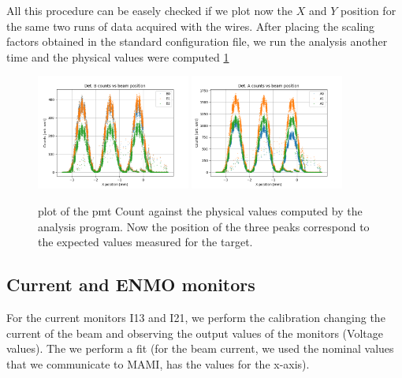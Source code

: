 All this procedure can be easely checked if we plot now the $X$ and $Y$ position for the same two runs of data acquired with the wires. After placing the scaling factors obtained in the standard configuration file, we run the analysis another time and the physical values were computed \ref{fig:CheckHori}

\begin{figure}[hbtp]
\centering
\includegraphics[width=0.45\textwidth]{Analysis/XcheckB.png} 
\includegraphics[width=0.45\textwidth]{Analysis/XcheckA.png}
\caption{plot of the pmt Count against the physical values computed by the analysis program. Now the position of the three peaks correspond to the expected values measured for the target.}
\label{fig:CheckHori}
\end{figure}


\subsection{Current and ENMO monitors}

For the current monitors I13 and I21, we perform the calibration changing the current of the beam and observing the output values of the monitors (Voltage values). The we perform a fit (for the beam current, we used the nominal values that we communicate to MAMI, has the values for the x-axis).

